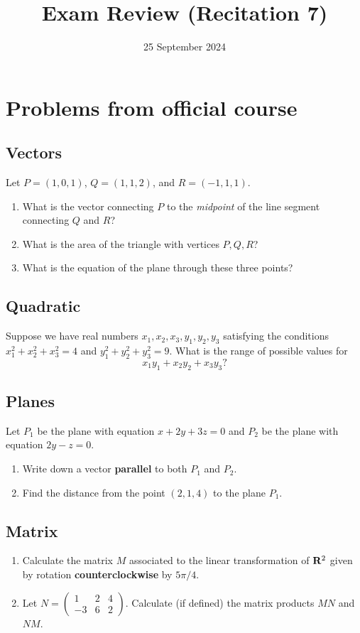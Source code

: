 \documentclass[11pt]{amsart}
\begin{document}
\title{Exam Review (Recitation 7)}
\date{25 September 2024}
\maketitle

\section{Problems from official course}
\subsection{Vectors}
Let $P = (1,0,1)$, $Q = (1,1,2)$, and $R = (-1,1,1).$
\begin{enumerate}
\item What is the vector connecting $P$ to the \emph{midpoint} of the line segment connecting $Q$ and $R$?
\item What is the area of the triangle with vertices $P,Q,R$?
\item What is the equation of the plane through these three points?
\end{enumerate}

\subsection{Quadratic}
Suppose we have real numbers $x_1, x_2, x_3, y_1, y_2, y_3$ satisfying the conditions
$x_1^2 + x_2^2 + x_3^2 = 4$ and $y_1^2 + y_2^2 + y_3^2 = 9$.  What is the range of possible values for
$$x_1y_1 + x_2y_2+x_3y_3?$$

\subsection{Planes}
Let $P_1$ be the plane with equation $x + 2y + 3z = 0$ and $P_2$ be the plane with equation $2y - z = 0$.
\begin{enumerate}
\item Write down a vector {\bf parallel} to both $P_1$ and $P_2$.
\item Find the distance from the point $(2, 1, 4)$ to the plane $P_1$.
\end{enumerate}

\subsection{Matrix}
\begin{enumerate}
\item Calculate the matrix $M$ associated to the linear transformation of ${\bf R}^2$ given by rotation {\bf counterclockwise} by $5\pi/4$.
\item Let $N = \begin{pmatrix} 1 & 2 & 4\\ -3 & 6 & 2\end{pmatrix}.$  Calculate (if defined) the matrix products $MN$ and $NM$.
\end{enumerate}
\end{document}
